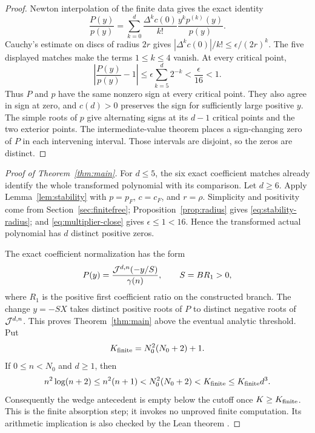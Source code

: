 \documentclass[12pt]{article}
\begin{document}
\begin{proof}
Newton interpolation of the finite data gives the exact identity
\begin{equation}\label{eq:newton-multiplier}
 \frac{P(y)}{p(y)}
 =\sum_{k=0}^{d}\frac{\Delta^kc(0)}{k!}
 \frac{y^kp^{(k)}(y)}{p(y)}.
\end{equation}
Cauchy's estimate on discs of radius $2r$ gives
$|\Delta^kc(0)|/k!\le\epsilon/(2r)^k$.  The five displayed matches make the
terms $1\le k\le4$ vanish.  At every critical point,
\begin{equation}\label{eq:geometric-tail}
 \left|\frac{P(y)}{p(y)}-1\right|
 \le\epsilon\sum_{k=5}^{d}2^{-k}
 <\frac\epsilon{16}<1.
\end{equation}
Thus $P$ and $p$ have the same nonzero sign at every critical point.  They
also agree in sign at zero, and $c(d)>0$ preserves the sign for sufficiently
large positive $y$.  The simple roots of $p$ give alternating signs at its
$d-1$ critical points and the two exterior points.  The intermediate-value
theorem places a sign-changing zero of $P$ in each intervening interval.
Those intervals are disjoint, so the zeros are distinct.
\end{proof}

\begin{proof}[Proof of Theorem~\ref{thm:main}]
For $d\le5$, the six exact coefficient matches already identify the whole
transformed polynomial with its comparison.  Let $d\ge6$.  Apply
Lemma~\ref{lem:stability} with $p=p_F$, $c=c_F$, and $r=\rho$.  Simplicity
and positivity come from Section~\ref{sec:finitefree};
Proposition~\ref{prop:radius} gives \eqref{eq:stability-radius}; and
\eqref{eq:multiplier-close} gives $\epsilon\le1<16$.  Hence the transformed
actual polynomial has $d$ distinct positive zeros.

The exact coefficient normalization has the form
\begin{equation}\label{eq:identify-Jensen}
 P(y)=\frac{\mathcal J^{d,n}(-y/S)}{\gamma(n)},
 \qquad S=BR_1>0,
\end{equation}
where $R_1$ is the positive first coefficient ratio on the constructed
branch.  The change $y=-SX$ takes distinct positive roots of $P$ to distinct
negative roots of $\mathcal J^{d,n}$.  This proves Theorem~\ref{thm:main} above the
eventual analytic threshold.  Put
\[
 K_{\rm finite}=N_0^2(N_0+2)+1.
\]
If $0\le n<N_0$ and $d\ge1$, then
\[
 n^2\log(n+2)\le n^2(n+1)
 <N_0^2(N_0+2)<K_{\rm finite}\le K_{\rm finite}d^3.
\]
Consequently the wedge antecedent is empty below the cutoff once
$K\ge K_{\rm finite}$.  This is the finite absorption step; it invokes no
unproved finite computation.  Its arithmetic implication is also checked
by the Lean theorem
.
\end{proof}
\end{document}
